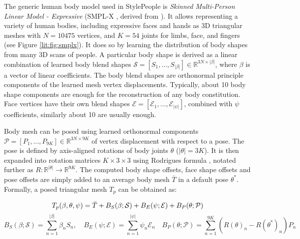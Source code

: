 The generic human body model used in StylePeople is \textit{Skinned Multi-Person Linear Model - Expressive} (SMPL-X \cite{dnn:smplx19}, derived from \cite{dnn:smpl15, dnn:smplify16}). It allows representing a variety of human bodies, including expressive faces and hands as 3D triangular meshes with $N = 10475$ vertices, and $K = 54$ joints for limbs, face, and fingers (see Figure \ref{lit:fig:smplx}). It does so by learning the distribution of body shapes from many 3D scans of people. A particular body shape is derived as a linear combination of learned body blend shapes $\mathcal{S}=[S_1, ..., S_{\lvert \beta \rvert}] \in \mathbb{R}^{3 N \times \lvert \beta \rvert}$, where $\beta$ is a vector of linear coefficients. The body blend shapes are orthonormal principle components of the learned mesh vertex displacements. Typically, about 10 body shape components are enough for the reconstruction of any body constitution. Face vertices have their own blend shapes $\mathcal{E}=[\mathcal{E}_1, ..., \mathcal{E}_{\lvert \psi \rvert}]$, combined with $\psi$ coefficients, similarly about 10 are usually enough.

Body mesh can be posed using learned orthonormal components $\mathcal{P}=[P_1, ..., P_{9K}] \in \mathbb{R}^{3 N \times 9 K}$ of vertex displacement with respect to a pose. The pose is defined by axis-aligned rotations of body joints $\theta$ ($\lvert \theta \rvert = 3 K$). It is then expanded into rotation matrices $K \times 3 \times 3$ using Rodrigues formula \cite{aux:rodrigues11}, notated further as $R : \mathbb{R}^{\lvert \theta \rvert} \rightarrow \mathbb{R}^{9 K}$. The computed body shape offsets, face shape offsets and pose offsets are simply added to an average body mesh $\bar{T}$ in a default pose $\theta^{*}$. Formally, a posed triangular mesh $T_p$ can be obtained as:

\setlength\abovedisplayskip{0pt}
\noindent
\begin{equation}
	\setlength\abovedisplayskip{0pt} T_p(\beta, \theta, \psi) = \bar{T} + B_S(\beta; \mathcal{S}) + B_E(\psi; \mathcal{E}) + B_P(\theta; \mathcal{P})
	\label{lit:eq:smplx-combined}
\end{equation}
\begin{equation}
	B_S(\beta; \mathcal{S}) = \sum_{n=1}^{\lvert \beta \rvert}\beta_n S_n, 
	\quad
	B_E(\psi; \mathcal{E}) = \sum_{n=1}^{\lvert \psi \rvert}\psi_n \mathcal{E}_n
	\quad
	B_P(\theta; \mathcal{P}) = \sum_{n=1}^{9K} \left( R(\theta)_n - R(\theta^{*})_n \right) P_n
	\label{lit:eq:smplx-components}
\end{equation}
\setlength\belowdisplayskip{0pt} 

